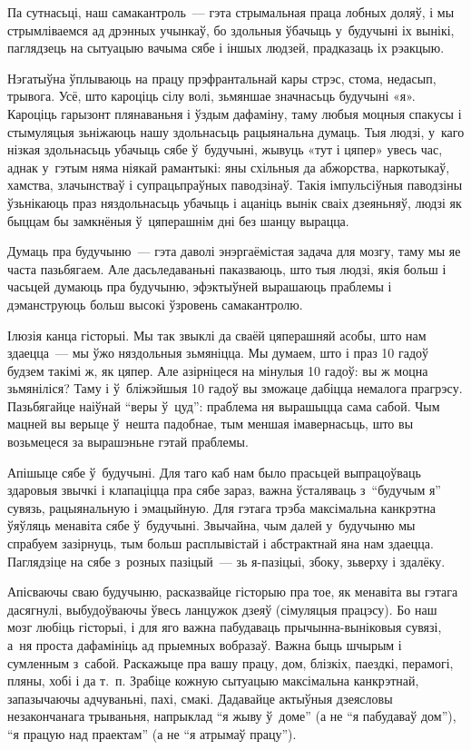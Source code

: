 Па сутнасьці, наш самакантроль~--- гэта стрымальная праца лобных доляў, і мы стрымліваемся ад дрэнных учынкаў, бо здольныя ўбачыць у~будучыні іх вынікі, паглядзець на сытуацыю вачыма сябе і іншых людзей, прадказаць іх рэакцыю.

Нэгатыўна ўплываюць на працу прэфрантальнай кары стрэс, стома, недасып, трывога. Усё, што кароціць сілу волі, зьмяншае значнасьць будучыні «я». Кароціць гарызонт плянаваньня і ўздым дафаміну, таму любыя моцныя спакусы і стымуляцыя зьніжаюць нашу здольнасьць рацыянальна думаць. Тыя людзі, у~каго нізкая здольнасьць убачыць сябе ў~будучыні, жывуць «тут і цяпер» увесь час, аднак у~гэтым няма ніякай рамантыкі: яны схільныя да абжорства, наркотыкаў, хамства, злачынстваў і супрацьпраўных паводзінаў. Такія імпульсіўныя паводзіны ўзьнікаюць праз няздольнасьць убачыць і ацаніць вынік сваіх дзеяньняў, людзі як быццам бы замкнёныя ў~цяперашнім дні без шанцу вырацца.

Думаць пра будучыню~--- гэта даволі энэргаёмістая задача для мозгу, таму мы яе часта пазьбягаем. Але дасьледаваньні паказваюць, што тыя людзі, якія больш і часьцей думаюць пра будучыню, эфэктыўней вырашаюць праблемы і дэманструюць больш высокі ўзровень самакантролю.

Ілюзія канца гісторыі. Мы так звыклі да сваёй цяперашняй асобы, што нам здаецца~--- мы ўжо няздольныя зьмяніцца. Мы думаем, што і праз 10 гадоў будзем такімі ж, як цяпер. Але азірніцеся на мінулыя 10 гадоў: вы ж моцна зьмяніліся? Таму і ў~бліжэйшыя 10 гадоў вы зможаце дабіцца немалога прагрэсу. Пазьбягайце наіўнай ``веры ў~цуд'': праблема ня вырашыцца сама сабой. Чым мацней вы верыце ў~нешта падобнае, тым меншая імавернасьць, што вы возьмецеся за вырашэньне гэтай праблемы.

Апішыце сябе ў~будучыні. Для таго каб нам было прасьцей выпрацоўваць здаровыя звычкі і клапаціцца пра сябе зараз, важна ўсталяваць з~``будучым я'' сувязь, рацыянальную і эмацыйную. Для гэтага трэба максімальна канкрэтна ўяўляць менавіта сябе ў~будучыні. Звычайна, чым далей у~будучыню мы спрабуем зазірнуць, тым больш расплывістай і абстрактнай яна нам здаецца. Паглядзіце на сябе з~розных пазіцый~--- зь я-пазіцыі, збоку, зьверху і здалёку.

Апісваючы сваю будучыню, расказвайце гісторыю пра тое, як менавіта вы гэтага дасягнулі, выбудоўваючы ўвесь ланцужок дзеяў (сімуляцыя працэсу). Бо наш мозг любіць гісторыі, і для яго важна пабудаваць прычынна-выніковыя сувязі, а~ня проста дафамініць ад прыемных вобразаў. Важна быць шчырым і сумленным з~сабой. Раскажыце пра вашу працу, дом, блізкіх, паездкі, перамогі, пляны, хобі і да т.~п. Зрабіце кожную сытуацыю максімальна канкрэтнай, запазычаючы адчуваньні, пахі, смакі. Дадавайце актыўныя дзеясловы незакончанага трываньня, напрыклад ``я жыву ў~доме'' (а не ``я пабудаваў дом''), ``я працую над праектам'' (а не ``я атрымаў працу'').

